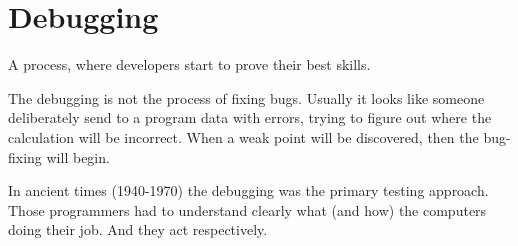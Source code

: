 \section{Debugging}
\label{sec:Debugging}

A process, where developers start to prove their best skills.

The debugging is not the process of fixing bugs. Usually it looks like someone deliberately send to a program data with errors, trying to figure out where the calculation will be incorrect. When a weak point will be discovered, then the bug-fixing will begin.

In ancient times (1940-1970) the debugging was the primary testing approach. Those programmers had to understand clearly what (and how) the computers doing their job. And they act respectively.